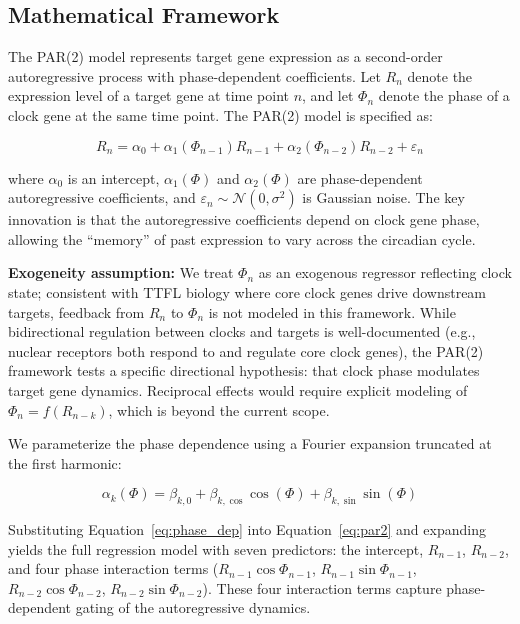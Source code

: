 \documentclass[11pt,a4paper]{article}
\begin{document}
\subsection{Mathematical Framework}

The PAR(2) model represents target gene expression as a second-order autoregressive process with phase-dependent coefficients. Let $R_n$ denote the expression level of a target gene at time point $n$, and let $\Phi_n$ denote the phase of a clock gene at the same time point. The PAR(2) model is specified as:

\begin{equation}
R_n = \alpha_0 + \alpha_1(\Phi_{n-1})R_{n-1} + \alpha_2(\Phi_{n-2})R_{n-2} + \varepsilon_n
\label{eq:par2}
\end{equation}

where $\alpha_0$ is an intercept, $\alpha_1(\Phi)$ and $\alpha_2(\Phi)$ are phase-dependent autoregressive coefficients, and $\varepsilon_n \sim \mathcal{N}(0, \sigma^2)$ is Gaussian noise. The key innovation is that the autoregressive coefficients depend on clock gene phase, allowing the ``memory'' of past expression to vary across the circadian cycle.

\textbf{Exogeneity assumption:} We treat $\Phi_n$ as an exogenous regressor reflecting clock state; consistent with TTFL biology where core clock genes drive downstream targets, feedback from $R_n$ to $\Phi_n$ is not modeled in this framework. While bidirectional regulation between clocks and targets is well-documented (e.g., nuclear receptors both respond to and regulate core clock genes), the PAR(2) framework tests a specific directional hypothesis: that clock phase modulates target gene dynamics. Reciprocal effects would require explicit modeling of $\Phi_n = f(R_{n-k})$, which is beyond the current scope.

We parameterize the phase dependence using a Fourier expansion truncated at the first harmonic:

\begin{equation}
\alpha_k(\Phi) = \beta_{k,0} + \beta_{k,\cos}\cos(\Phi) + \beta_{k,\sin}\sin(\Phi)
\label{eq:phase_dep}
\end{equation}

Substituting Equation~\ref{eq:phase_dep} into Equation~\ref{eq:par2} and expanding yields the full regression model with seven predictors: the intercept, $R_{n-1}$, $R_{n-2}$, and four phase interaction terms ($R_{n-1}\cos\Phi_{n-1}$, $R_{n-1}\sin\Phi_{n-1}$, $R_{n-2}\cos\Phi_{n-2}$, $R_{n-2}\sin\Phi_{n-2}$). These four interaction terms capture phase-dependent gating of the autoregressive dynamics.
\end{document}
